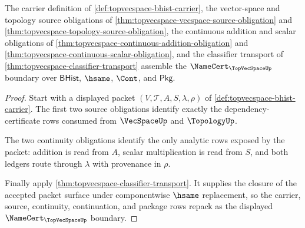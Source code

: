 \begin{theorem}
\label{thm:topvecspace-namecert-boundary}
The carrier definition of \autoref{def:topvecspace-bhist-carrier}, the vector-space and topology source obligations of \autoref{thm:topvecspace-vecspace-source-obligation} and \autoref{thm:topvecspace-topology-source-obligation}, the continuous addition and scalar obligations of \autoref{thm:topvecspace-continuous-addition-obligation} and \autoref{thm:topvecspace-continuous-scalar-obligation}, and the classifier transport of \autoref{thm:topvecspace-classifier-transport} assemble the $\NameCert_{\TopVecSpaceUp}$ boundary over $\mathsf{BHist}$, $\hsame$, $\Cont$, and $\mathsf{Pkg}$.
\end{theorem}
\begin{proof}
Start with a displayed packet $(V,\mathcal T,A,S,\lambda,\rho)$ of \autoref{def:topvecspace-bhist-carrier}. The first two source obligations identify exactly the dependency-certificate rows consumed from $\VecSpaceUp$ and $\TopologyUp$.

The two continuity obligations identify the only analytic rows exposed by the packet: addition is read from $A$, scalar multiplication is read from $S$, and both ledgers route through $\lambda$ with provenance in $\rho$.

Finally apply \autoref{thm:topvecspace-classifier-transport}. It supplies the closure of the accepted packet surface under componentwise $\hsame$ replacement, so the carrier, source, continuity, continuation, and package rows repack as the displayed $\NameCert_{\TopVecSpaceUp}$ boundary.
\end{proof}

